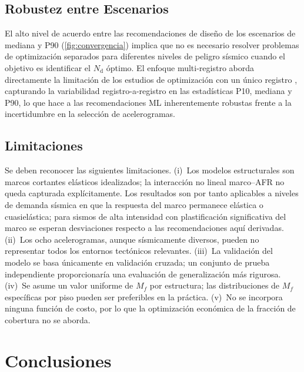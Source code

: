 \documentclass[preprint,12pt,authoryear]{elsarticle}
\newcommand{\nd}{N_{\mathrm{d}}}
\newcommand{\Mf}{M_{\!f}}
\begin{document}
\subsection{Robustez entre Escenarios}

El alto nivel de acuerdo entre las recomendaciones de diseño de los escenarios
de mediana y P90 (\cref{fig:convergencia}) implica que no es necesario resolver
problemas de optimización separados para diferentes niveles de peligro sísmico
cuando el objetivo es identificar el $\nd$ óptimo. El enfoque multi-registro
aborda directamente la limitación de los estudios de optimización con un único
registro \citep{Jarrahi2020jbe,Jarrahi2020sdee}, capturando la variabilidad
registro-a-registro en las estadísticas P10, mediana y P90, lo que hace a las
recomendaciones ML inherentemente robustas frente a la incertidumbre en la
selección de acelerogramas.

\subsection{Limitaciones}

Se deben reconocer las siguientes limitaciones. (i)~Los modelos estructurales son marcos cortantes elásticos idealizados; la
interacción no lineal marco--AFR no queda capturada explícitamente. Los
resultados son por tanto aplicables a niveles de demanda sísmica en que la
respuesta del marco permanece elástica o cuasielástica; para sismos de alta
intensidad con plastificación significativa del marco se esperan desviaciones
respecto a las recomendaciones aquí derivadas. (ii)~Los ocho acelerogramas, aunque sísmicamente
diversos, pueden no representar todos los entornos tectónicos relevantes.
(iii)~La validación del modelo se basa únicamente en validación cruzada; un
conjunto de prueba independiente proporcionaría una evaluación de generalización
más rigurosa. (iv)~Se asume un valor uniforme de $\Mf$ por estructura; las
distribuciones de $\Mf$ específicas por piso pueden ser preferibles en la
práctica. (v)~No se incorpora ninguna función de costo, por lo que la
optimización económica de la fracción de cobertura no se aborda.

\section{Conclusiones}
\label{sec:conclusions}
\end{document}
